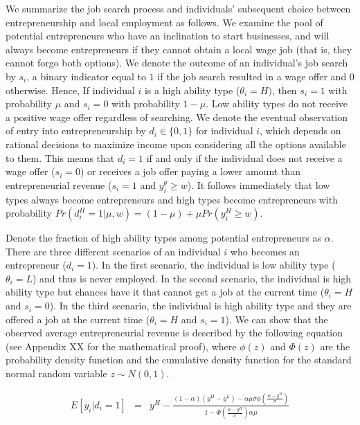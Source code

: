 \documentclass[letterpaper,12pt]{article}
\begin{document}
We summarize the job search process and individuals' subsequent choice between entrepreneurship and local employment as follows. We examine the pool of potential entrepreneurs who have an inclination to start businesses, and will always become entrepreneurs if they cannot obtain a local wage job (that is, they cannot forgo both options). We denote the outcome of an individual's job search by $s_{i}$, a binary indicator equal to $1$ if the job search resulted in a wage offer and $0$ otherwise. Hence, If individual $i$ is a high ability type ($\theta_{i}=H)$, then $s_{i}=1$ with probability $\mu$ and $s_{i}=0$ with probability $1-\mu$. Low ability types do not receive a positive wage offer regardless of searching. We denote the eventual observation of entry into entrepreneurship by $d_{i}\in\{0,1\}$ for individual $i$, which depends on rational decisions to maximize income upon considering all the options available to them. This means that $d_{i}=1$ if and only if the individual does not receive a wage offer ($s_{i}=0$) or receives a job offer paying a lower amount than entrepreneurial revenue ($s_{i}=1$ and $y^{\theta}_{i}\geq w$). It follows immediately that low types always become entrepreneurs and high types become entrepreneurs with probability $Pr\left(d^{H}_{i}=1 \vert \mu, w\right) = (1-\mu) + \mu Pr(y^{H}_{i}\geq w)$.

Denote the fraction of high ability types among potential entrepreneurs as $\alpha$. There are three different scenarios of an individual $i$ who becomes an entrepreneur ($d_{i}=1$). In the first scenario, the individual is low ability type ($\theta_{i}=L$) and thus is never employed. In the second scenario, the individual is high ability type but chances have it that cannot get a job at the current time ($\theta_{i}=H$ and $s_{i}=0$). In the third scenario, the individual is high ability type and they are offered a job at the current time ($\theta_{i}=H$ and $s_{i}=1$). We can show that the observed average entrepreneurial revenue is described by the following equation (see Appendix XX for the mathematical proof), where $\phi(z)$ and $\Phi(z)$ are the probability density function and the cumulative density function for the standard normal random variable $z\sim N(0,1)$.

\begin{eqnarray} \label{eq:rev}
    E[y_{i}\vert d_{i}=1] &=& y^{H}-\frac{(1-\alpha)(y^{H}-y^{L})-\alpha\mu\sigma\phi\left(\frac{w-y^{H}}{\sigma}\right)}{1-\Phi\left(\frac{w-y^{H}}{\sigma}\right)\alpha\mu}
\end{eqnarray}
\end{document}

